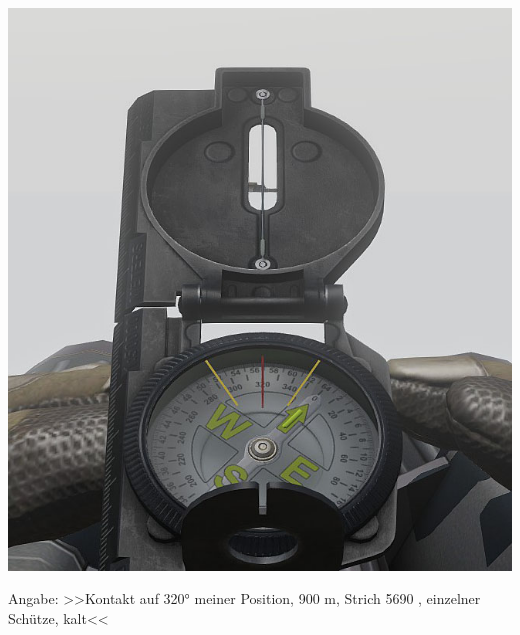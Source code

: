 \begin{minipage}[t]{1\textwidth}
	\includegraphics[width=\textwidth]{./Grafiken/KarteUndMarkierungen/Kompass6.jpg}
\end{minipage}
Angabe: >>Kontakt auf 320° meiner Position, 900 m, Strich 5690 , einzelner Schütze, kalt<<